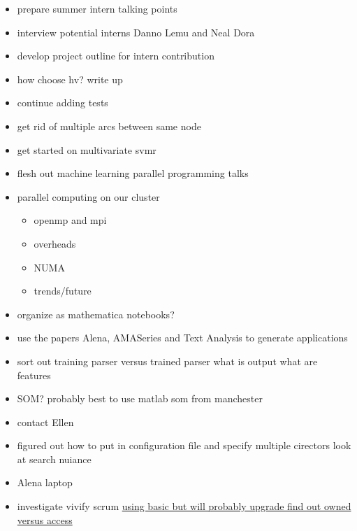 \documentclass[hyperref]{labbook}
\begin{document}
\begin{itemize}
\item prepare summer intern talking points
\item interview potential interns  Danno Lemu and Neal Dora
\item develop project outline for intern contribution
\item how choose hv?  write up
\end{itemize}

\begin{itemize}
\item continue adding tests
\item get rid of multiple arcs between same node
\item get started on multivariate svmr
\end{itemize}


\begin{itemize}
\item flesh out machine learning parallel programming talks
\item parallel computing on our cluster
  \begin{itemize}
  \item openmp and mpi
  \item overheads
  \item NUMA
  \item trends/future
  \end{itemize}
\item organize as mathematica notebooks?
\item use the papers Alena, AMASeries and Text Analysis to generate applications
\end{itemize}

\begin{itemize}
\item sort out training parser versus trained parser  what is output  what are features
\item SOM?  probably best to use matlab som from manchester
\item contact Ellen
\end{itemize}

\begin{itemize}
\item figured out how to put in configuration file and specify multiple cirectors  look at search nuiance
\item Alena laptop
\item investigate vivify scrum \href{https://www.vivifyscrum.com/feature/how-it-works}{using basic but will probably upgrade find out owned versus access}
\end{itemize}
\end{document}
